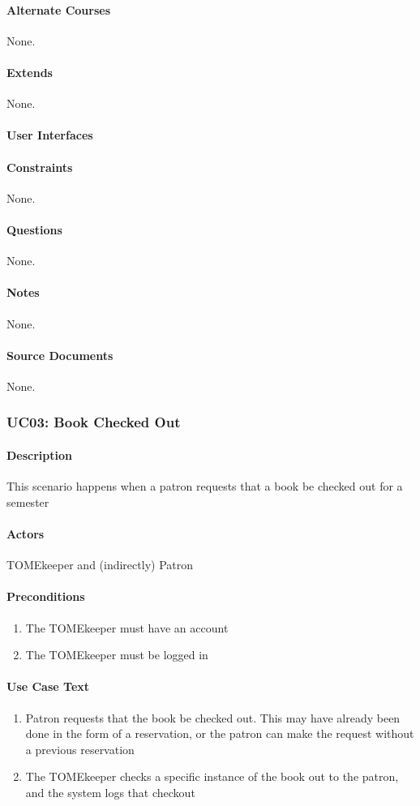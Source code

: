 \documentclass[12pt,titlepage]{article}
\begin{document}
\paragraph{Alternate Courses}
None.
\paragraph{Extends}
None.
\paragraph{User Interfaces}
\paragraph{Constraints}
None.
\paragraph{Questions}
None.
\paragraph{Notes}
None.
\paragraph{Source Documents}
None.

\subsubsection{UC03: Book Checked Out}
\paragraph{Description}
This scenario happens when a patron requests that a book be checked out for a semester
\paragraph{Actors}
TOMEkeeper and (indirectly) Patron
\paragraph{Preconditions}
\begin{enumerate}
	\item The TOMEkeeper must have an account
	\item The TOMEkeeper must be logged in
\end{enumerate}
\paragraph{Use Case Text}
\begin{enumerate}
	\item Patron requests that the book be checked out.  This may have already been done in the form of a reservation, or the patron can make the request without a previous reservation
	\item The TOMEkeeper checks a specific instance of the book out to the patron, and the system logs that checkout
\end{enumerate}
\end{document}
